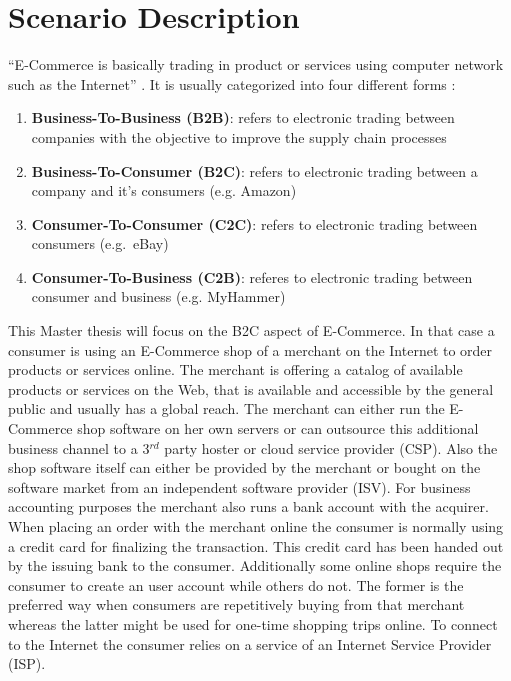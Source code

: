 
\section{Scenario Description}
\label{sec:scenario_description}

``E-Commerce is basically trading in product or services using computer network such as the Internet'' \citep{sen2015study}.
It is usually categorized into four different forms \citep{sen2015study}:

\begin{enumerate}
  \item \textbf{Business-To-Business (B2B)}: refers to electronic trading between companies with the objective to improve the supply chain processes
  \item \textbf{Business-To-Consumer (B2C)}: refers to electronic trading between a company and it's consumers (e.g. Amazon)
  \item \textbf{Consumer-To-Consumer (C2C)}: refers to electronic trading between consumers (e.g.\ eBay)
  \item \textbf{Consumer-To-Business (C2B)}: referes to electronic trading between consumer and business (e.g. MyHammer)
\end{enumerate}

This Master thesis will focus on the B2C aspect of E-Commerce. In that case a consumer is using an E-Commerce shop of a merchant on the Internet to
order products or services online. The merchant is offering a catalog of available products or services on the Web, that is available and accessible
by the general public and usually has a global reach. The merchant can either run the E-Commerce shop software on her own servers or can outsource this additional business channel to a 3$^{rd}$ party hoster or cloud
service provider (CSP). Also the shop software itself can either be provided by the merchant or bought on the software market from an independent software provider (ISV).
For business accounting purposes the merchant also runs a bank account with the acquirer. \\
When placing an order with the merchant online the consumer is normally using a credit card for finalizing the transaction. This credit card has been handed out by the issuing bank to the consumer.
Additionally some online shops require the consumer to create an user account while others do not. The former is the preferred way when consumers are repetitively buying from that merchant
whereas the latter might be used for one-time shopping trips online. To connect to the Internet the consumer relies on a service of an Internet Service Provider (ISP). \\

